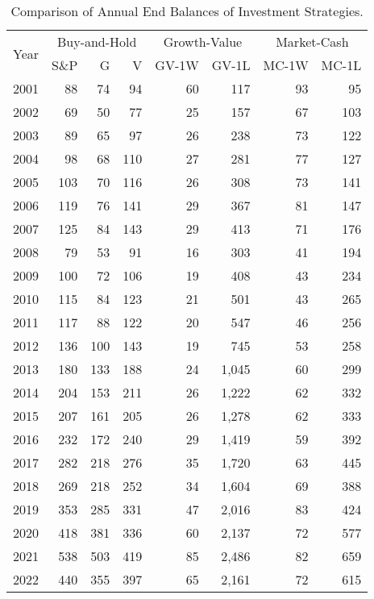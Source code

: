 \documentclass{article}
\begin{document}
\begin{table}[!ht]
    \centering
    \caption{Comparison of Annual End Balances of Investment Strategies.}
    \medskip
    \begin{tabular}{l | rrr | rr | rr}
    \hline
\multirow{2}{*}{Year} & \multicolumn{3}{c|}{Buy-and-Hold}   
& \multicolumn{2}{c|}{Growth-Value}  &  \multicolumn{2}{c}{Market-Cash}  \\\cline{2-8}
  & S\&P & G & V & GV-1W & GV-1L & MC-1W & MC-1L \\ \hline
        2001 & 88 & 74 & 94 & 60 & 117 & 93 & 95 \\ 
        2002 & 69 & 50 & 77 & 25 & 157 & 67 & 103 \\ 
        2003 & 89 & 65 & 97 & 26 & 238 & 73 & 122 \\ 
        2004 & 98 & 68 & 110 & 27 & 281 & 77 & 127 \\ 
        2005 & 103 & 70 & 116 & 26 & 308 & 73 & 141 \\ 
        2006 & 119 & 76 & 141 & 29 & 367 & 81 & 147 \\ 
        2007 & 125 & 84 & 143 & 29 & 413 & 71 & 176 \\ 
        2008 & 79 & 53 & 91 & 16 & 303 & 41 & 194 \\ 
        2009 & 100 & 72 & 106 & 19 & 408 & 43 & 234 \\ 
        2010 & 115 & 84 & 123 & 21 & 501 & 43 & 265 \\ 
        2011 & 117 & 88 & 122 & 20 & 547 & 46 & 256 \\ 
        2012 & 136 & 100 & 143 & 19 & 745 & 53 & 258 \\ 
        2013 & 180 & 133 & 188 & 24 & 1,045 & 60 & 299 \\ 
        2014 & 204 & 153 & 211 & 26 & 1,222 & 62 & 332 \\ 
        2015 & 207 & 161 & 205 & 26 & 1,278 & 62 & 333 \\ 
        2016 & 232 & 172 & 240 & 29 & 1,419 & 59 & 392 \\ 
        2017 & 282 & 218 & 276 & 35 & 1,720 & 63 & 445 \\ 
        2018 & 269 & 218 & 252 & 34 & 1,604 & 69 & 388 \\ 
        2019 & 353 & 285 & 331 & 47 & 2,016 & 83 & 424 \\ 
        2020 & 418 & 381 & 336 & 60 & 2,137 & 72 & 577 \\ 
        2021 & 538 & 503 & 419 & 85 & 2,486 & 82 & 659 \\ 
        2022 & 440 & 355 & 397 & 65 & 2,161 & 72 & 615 \\ 

\end{tabular}
\end{table}
\end{document}
